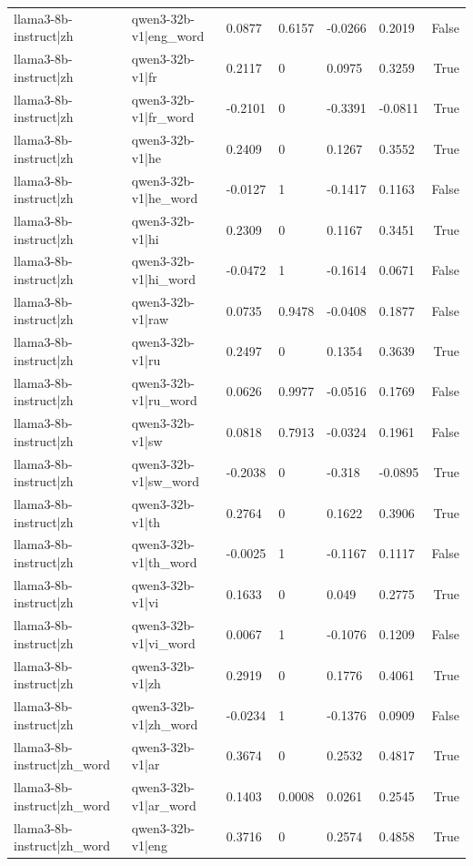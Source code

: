 \begin{table}
\begin{tabular}{llllllr}
llama3-8b-instruct|zh & qwen3-32b-v1|eng_word & 0.0877 & 0.6157 & -0.0266 & 0.2019 & False \\
llama3-8b-instruct|zh & qwen3-32b-v1|fr & 0.2117 & 0 & 0.0975 & 0.3259 & True \\
llama3-8b-instruct|zh & qwen3-32b-v1|fr_word & -0.2101 & 0 & -0.3391 & -0.0811 & True \\
llama3-8b-instruct|zh & qwen3-32b-v1|he & 0.2409 & 0 & 0.1267 & 0.3552 & True \\
llama3-8b-instruct|zh & qwen3-32b-v1|he_word & -0.0127 & 1 & -0.1417 & 0.1163 & False \\
llama3-8b-instruct|zh & qwen3-32b-v1|hi & 0.2309 & 0 & 0.1167 & 0.3451 & True \\
llama3-8b-instruct|zh & qwen3-32b-v1|hi_word & -0.0472 & 1 & -0.1614 & 0.0671 & False \\
llama3-8b-instruct|zh & qwen3-32b-v1|raw & 0.0735 & 0.9478 & -0.0408 & 0.1877 & False \\
llama3-8b-instruct|zh & qwen3-32b-v1|ru & 0.2497 & 0 & 0.1354 & 0.3639 & True \\
llama3-8b-instruct|zh & qwen3-32b-v1|ru_word & 0.0626 & 0.9977 & -0.0516 & 0.1769 & False \\
llama3-8b-instruct|zh & qwen3-32b-v1|sw & 0.0818 & 0.7913 & -0.0324 & 0.1961 & False \\
llama3-8b-instruct|zh & qwen3-32b-v1|sw_word & -0.2038 & 0 & -0.318 & -0.0895 & True \\
llama3-8b-instruct|zh & qwen3-32b-v1|th & 0.2764 & 0 & 0.1622 & 0.3906 & True \\
llama3-8b-instruct|zh & qwen3-32b-v1|th_word & -0.0025 & 1 & -0.1167 & 0.1117 & False \\
llama3-8b-instruct|zh & qwen3-32b-v1|vi & 0.1633 & 0 & 0.049 & 0.2775 & True \\
llama3-8b-instruct|zh & qwen3-32b-v1|vi_word & 0.0067 & 1 & -0.1076 & 0.1209 & False \\
llama3-8b-instruct|zh & qwen3-32b-v1|zh & 0.2919 & 0 & 0.1776 & 0.4061 & True \\
llama3-8b-instruct|zh & qwen3-32b-v1|zh_word & -0.0234 & 1 & -0.1376 & 0.0909 & False \\
llama3-8b-instruct|zh_word & qwen3-32b-v1|ar & 0.3674 & 0 & 0.2532 & 0.4817 & True \\
llama3-8b-instruct|zh_word & qwen3-32b-v1|ar_word & 0.1403 & 0.0008 & 0.0261 & 0.2545 & True \\
llama3-8b-instruct|zh_word & qwen3-32b-v1|eng & 0.3716 & 0 & 0.2574 & 0.4858 & True \\

\end{tabular}
\end{table}
